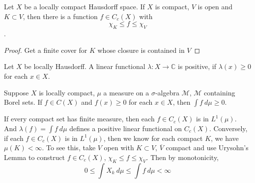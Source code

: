 
\chapter{}

\begin{theorem}
  Let $X$ be a locally compact Hausdorff space. If $X$ is compact,
  $V$ is open and $K \subset V$, then there is a function $f \in
  C_c(X)$ with $$\chi_K \le f \le \chi_V$$.
\end{theorem}
\begin{proof}
  Get a finite cover for $K$ whose closure is contained in $V$
\end{proof}

\begin{definition}
  Let $X$ be locally Hausdorff. A linear functional $\lambda: X \to
  \mathbb{C}$ is positive, if $\lambda(x) \ge 0$ for each $x \in X$.
\end{definition}

\begin{remark}
  Suppose $X$ is locally compact, $\mu$ a measure on a
  $\sigma$-algebra $\mathcal{M}$, $\mathcal{M}$ containing Borel
  sets. If $f \in C(X)$ and $f(x) \ge 0$ for each $x \in X$, then
  $\int  f \ d \mu \ge 0$.

  If every compact set has finite measure, then each $f \in C_c(X)$
  is in $L^{1}(\mu)$. And $\lambda(f) = \int  f \ d \mu$ defines a
  positive linear functional on $C_c(X)$. Conversely, if each $f \in
  C_c(X)$ is in $L^1(\mu)$, then we know for each compact $K$, we
  have $\mu(K) < \infty$. To see this, take $V$ open with $K \subset
  V$, $\overline{V}$ compact and use Urysohn's Lemma to construct $f
  \in C_c(X)$, $\chi_K \le f \le \chi_V$. Then by monotonicity, \[
    0 \le \int X_k \ d \mu \le \int  f \ d \mu < \infty
  \]
\end{remark}


